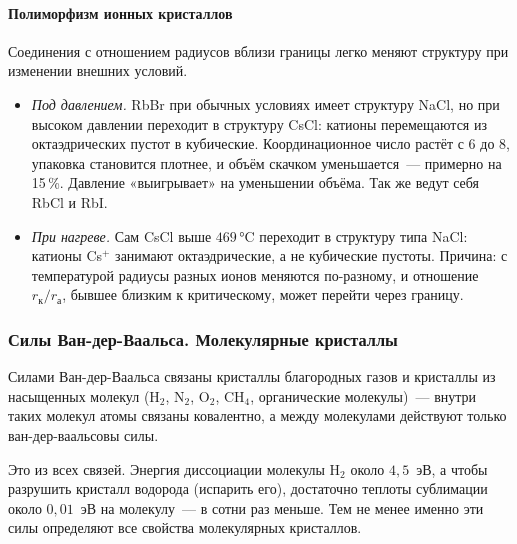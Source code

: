 \paragraph{Полиморфизм ионных кристаллов}
Соединения с отношением радиусов вблизи границы легко меняют структуру
при изменении внешних условий.
\begin{itemize}
\item \emph{Под давлением.} RbBr при обычных условиях имеет структуру
NaCl, но при высоком давлении переходит в структуру CsCl: катионы
перемещаются из октаэдрических пустот в кубические. Координационное число
растёт с 6 до 8, упаковка становится плотнее, и объём скачком
уменьшается~— примерно на 15\,\%. Давление «выигрывает» на уменьшении
объёма. Так же ведут себя RbCl и RbI.
\item \emph{При нагреве.} Сам CsCl выше $469$\,°C переходит в структуру
типа NaCl: катионы Cs$^+$ занимают октаэдрические, а не кубические
пустоты.
Причина: с температурой радиусы разных ионов меняются по-разному, и
отношение $r_\text{к}/r_\text{а}$, бывшее близким к критическому, может
перейти через границу.
\end{itemize}

\subsubsection{Силы Ван-дер-Ваальса. Молекулярные кристаллы}\label{sssec:vdw}

Силами Ван-дер-Ваальса связаны кристаллы благородных газов и кристаллы
из насыщенных молекул (H$_2$, N$_2$, O$_2$, CH$_4$, органические
молекулы)~— внутри таких молекул атомы связаны ковалентно, а между
молекулами действуют только ван-дер-ваальсовы силы.

Это  из всех связей. Энергия диссоциации молекулы
H$_2$ около $4{,}5$~эВ, а чтобы разрушить кристалл водорода (испарить
его), достаточно теплоты сублимации около $0{,}01$~эВ на молекулу~— в
сотни раз меньше. Тем
не менее именно эти силы определяют все свойства молекулярных
кристаллов.

